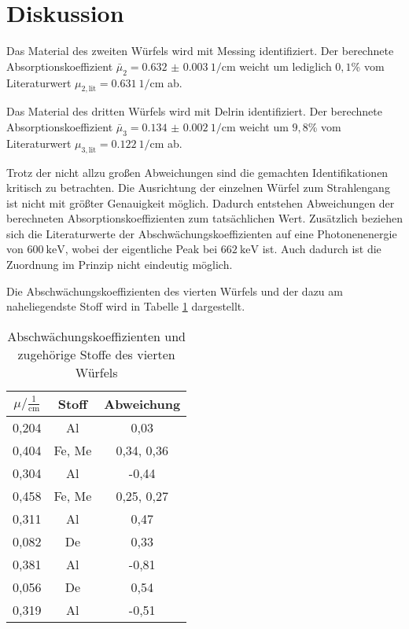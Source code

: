 \section{Diskussion}
\label{sec:Diskussion}
Das Material des zweiten Würfels wird mit Messing identifiziert. Der berechnete
Absorptionskoeffizient $\bar\mu_2 = \SI{0.632(3)}{1\per\centi\meter}$ weicht um
lediglich $0,1$\% vom Literaturwert $\mu_{2, \mathrm{ lit}} = \SI{0.631}{1\per\centi\meter}$
ab.

Das Material des dritten Würfels wird mit Delrin identifiziert. Der berechnete
Absorptionskoeffizient $\bar\mu_3 = \SI{0.134(2)}{1\per\centi\meter}$ weicht um
$9,8$\% vom Literaturwert $\mu_{3, \mathrm{ lit}} = \SI{0.122}{1\per\centi\meter}$
ab.

Trotz der nicht allzu großen Abweichungen sind die gemachten Identifikationen
kritisch zu betrachten. Die Ausrichtung der einzelnen Würfel zum Strahlengang
ist nicht mit größter Genauigkeit möglich. Dadurch entstehen Abweichungen der
berechneten Absorptionskoeffizienten zum tatsächlichen Wert.
Zusätzlich beziehen sich die Literaturwerte der Abschwächungskoeffizienten auf
eine Photonenenergie von $\SI{600}{\kilo\eV}$, wobei der eigentliche Peak
bei $\SI{662}{\kilo\eV}$ ist. Auch dadurch ist die Zuordnung im Prinzip nicht
eindeutig möglich.

Die Abschwächungskoeffizienten des vierten Würfels und der dazu am naheliegendste Stoff wird in
Tabelle \ref{tab:abw} dargestellt.

\begin{table}[H]
  \centering
  \caption{Abschwächungskoeffizienten und zugehörige Stoffe des vierten Würfels}
  \label{tab:abw}
  \begin{tabular}{c c c}
    \toprule
    $\mu/ \mathrm{\frac{1}{cm}}$ & Stoff & Abweichung   \\
    \midrule
    0,204      &  Al     &   0,03    \\
    0,404      &  Fe, Me &   0,34, 0,36    \\
    0,304      &  Al     &  -0,44    \\
    0,458      &  Fe, Me &   0,25, 0,27    \\
    0,311      &  Al     &   0,47    \\
    0,082      &  De     &   0,33    \\
    0,381      &  Al     &  -0,81    \\
    0,056      &  De     &   0,54   \\
    0,319      &  Al     &  -0,51  \\
    \bottomrule
  \end{tabular}
\end{table}

